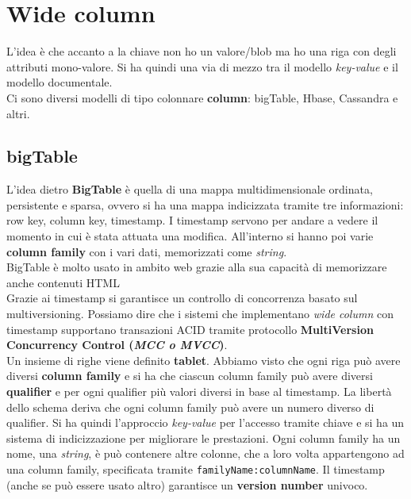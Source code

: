 \section{Wide column}
L'idea è che accanto a la chiave non ho un valore/blob ma ho una riga con degli attributi mono-valore. Si ha quindi una via di mezzo tra il modello \textit{key-value} e il modello documentale. \\ 
Ci sono diversi modelli di tipo colonnare \textbf{column}: bigTable, Hbase, Cassandra e altri.
\subsection{bigTable}
L'idea dietro \textbf{BigTable} è quella di una mappa multidimensionale ordinata, persistente e sparsa, ovvero si ha una mappa indicizzata tramite tre informazioni: row key, column key, timestamp. I timestamp servono per andare a vedere il momento in cui è stata attuata una modifica. All'interno si hanno poi varie \textbf{column family} con i vari dati, memorizzati come \textit{string}.\\ BigTable è molto usato in ambito web grazie alla sua capacità di memorizzare anche contenuti HTML\\
Grazie ai timestamp si garantisce un controllo di concorrenza basato sul multiversioning. Possiamo dire che i sistemi che implementano \textit{wide column} con timestamp supportano transazioni ACID tramite protocollo \textbf{MultiVersion Concurrency Control (\textit{MCC o MVCC})}.\\
Un insieme di righe viene definito \textbf{tablet}. Abbiamo visto che ogni riga può avere diversi \textbf{column family} e si ha che ciascun column family può avere diversi \textbf{qualifier} e per ogni qualifier più valori diversi in base al timestamp. La libertà dello schema deriva che ogni column family può avere un numero diverso di qualifier. Si ha quindi l'approccio \textit{key-value} per l'accesso tramite chiave e si ha un sistema di indicizzazione per migliorare le prestazioni. Ogni column family ha un nome, una \textit{string}, è può contenere altre colonne, che a loro volta appartengono ad una column family, specificata tramite \texttt{familyName:columnName}. Il timestamp (anche se può essere usato altro) garantisce un \textbf{version number} univoco.
